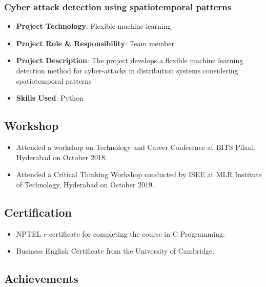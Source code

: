 \documentclass[
  letterpaper,
  DIV=11,
  numbers=noendperiod]{scrartcl}
\providecommand{\tightlist}{%
  \setlength{\itemsep}{0pt}\setlength{\parskip}{0pt}}\usepackage{longtable,booktabs,array}
\begin{document}
\hypertarget{cyber-attack-detection-using-spatiotemporal-patterns}{%
\subsubsection{Cyber attack detection using spatiotemporal
patterns}\label{cyber-attack-detection-using-spatiotemporal-patterns}}

\begin{itemize}
\tightlist
\item
  \textbf{Project Technology}: Flexible machine learning
\item
  \textbf{Project Role \& Responsibility}: Team member
\item
  \textbf{Project Description}: The project develops a flexible machine
  learning detection method for cyber-attacks in distribution systems
  considering spatiotemporal patterns
\item
  \textbf{Skills Used}: Python
\end{itemize}

\hypertarget{workshop}{%
\subsection{Workshop}\label{workshop}}

\begin{itemize}
\tightlist
\item
  Attended a workshop on Technology and Career Conference at BITS
  Pilani, Hyderabad on October 2018.
\item
  Attended a Critical Thinking Workshop conducted by ISEE at MLR
  Institute of Technology, Hyderabad on October 2019.
\end{itemize}

\hypertarget{certification}{%
\subsection{Certification}\label{certification}}

\begin{itemize}
\tightlist
\item
  NPTEL e-certificate for completing the course in C Programming.
\item
  Business English Certificate from the University of Cambridge.
\end{itemize}

\hypertarget{achievements}{%
\subsection{Achievements}\label{achievements}}
\end{document}

